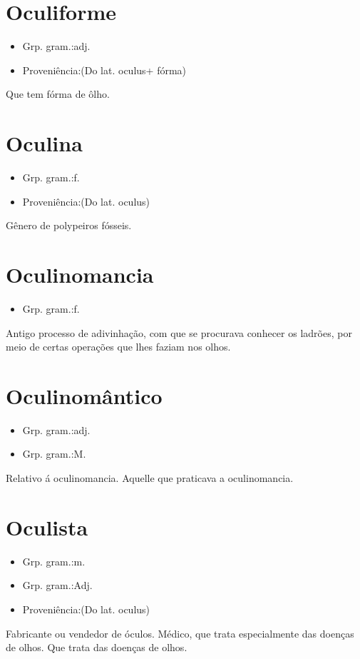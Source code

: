 \section{Oculiforme}
\begin{itemize}
\item {Grp. gram.:adj.}
\end{itemize}
\begin{itemize}
\item {Proveniência:(Do lat. \textunderscore oculus\textunderscore  + \textunderscore fórma\textunderscore )}
\end{itemize}
Que tem fórma de ôlho.
\section{Oculina}
\begin{itemize}
\item {Grp. gram.:f.}
\end{itemize}
\begin{itemize}
\item {Proveniência:(Do lat. \textunderscore oculus\textunderscore )}
\end{itemize}
Gênero de polypeiros fósseis.
\section{Oculinomancia}
\begin{itemize}
\item {Grp. gram.:f.}
\end{itemize}
Antigo processo de adivinhação, com que se procurava conhecer os ladrões, por meio de certas operações que lhes faziam nos olhos.
\section{Oculinomântico}
\begin{itemize}
\item {Grp. gram.:adj.}
\end{itemize}
\begin{itemize}
\item {Grp. gram.:M.}
\end{itemize}
Relativo á oculinomancia.
Aquelle que praticava a oculinomancia.
\section{Oculista}
\begin{itemize}
\item {Grp. gram.:m.}
\end{itemize}
\begin{itemize}
\item {Grp. gram.:Adj.}
\end{itemize}
\begin{itemize}
\item {Proveniência:(Do lat. \textunderscore oculus\textunderscore )}
\end{itemize}
Fabricante ou vendedor de óculos.
Médico, que trata especialmente das doenças de olhos.
Que trata das doenças de olhos.
